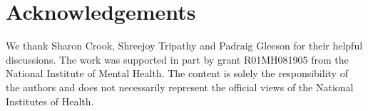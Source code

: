 \documentclass[9pt]{sig-alternate}
\begin{document}
\section*{Acknowledgements}
We thank Sharon Crook, Shreejoy Tripathy and Padraig Gleeson for their helpful discussions.  
The work was supported in part by grant R01MH081905 from the National Institute of Mental Health. 
The content is solely the responsibility of the authors and does not necessarily represent the official views of the National Institutes of Health.





%
%
%


%

%
%


%
%
%




\end{document}
